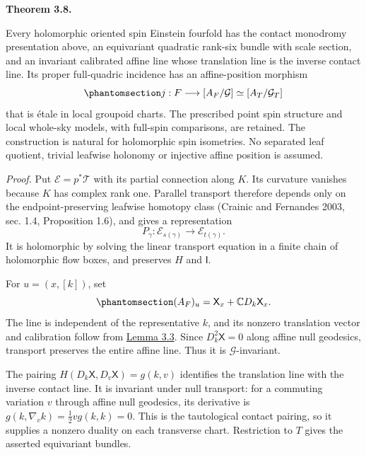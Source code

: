 \documentclass[
  english,
  11pt,
  reqno]{amsart}
\makeatletter
\newcommand{\pandocstatementheading}[1]{%
  \par\addpenalty{\@beginparpenalty}%
  \addvspace{.5\baselineskip plus .2\baselineskip minus .2\baselineskip}%
  {\normalfont\bfseries #1\par}%
  \nobreak\@afterindenttrue\@afterheading
}
\makeatother
\begin{document}
\pandocstatementheading{\protect{}\label{thm:monodromy-affine-forward-construction}Theorem 3.8.}

Every holomorphic oriented spin Einstein fourfold has the contact
monodromy presentation above, an equivariant quadratic rank-six bundle
with scale section, and an invariant calibrated affine line whose
translation line is the inverse contact line. Its proper full-quadric
incidence has an affine-position morphism
\begin{equation}\protect\phantomsection\label{eq:monodromy-affine-position-morphism}{
j:F\longrightarrow[A_F/\mathcal G]\simeq[A_T/\mathcal G_T]
}\end{equation} that is étale in local groupoid charts. The prescribed
point spin structure and local whole-sky models, with full-spin
comparisons, are retained. The construction is natural for holomorphic
spin isometries. No separated leaf quotient, trivial leafwise holonomy
or injective affine position is assumed.

\emph{Proof.} Put \(\mathcal E=p^*\mathcal T\) with its partial
connection along \(K\). Its curvature vanishes because \(K\) has complex
rank one. Parallel transport therefore depends only on the
endpoint-preserving leafwise homotopy class (Crainic and Fernandes 2003,
sec. 1.4, Proposition 1.6), and gives a representation \[
P_\gamma:\mathcal E_{s(\gamma)}\longrightarrow\mathcal E_{t(\gamma)}.
\] It is holomorphic by solving the linear transport equation in a
finite chain of holomorphic flow boxes, and preserves \(H\) and
\(\mathsf I\).

For \(u=(x,[k])\), set
\begin{equation}\protect\phantomsection\label{eq:monodromy-affine-line}{
(A_F)_u=\mathsf X_x+\mathbb C D_k\mathsf X_x.
}\end{equation} The line is independent of the representative \(k\), and
its nonzero translation vector and calibration follow from
\hyperref[lem:real-ray-affine-tractor]{Lemma 3.3}. Since
\(D_k^2\mathsf X=0\) along affine null geodesics, transport preserves
the entire affine line. Thus it is \(\mathcal G\)-invariant.

The pairing \(H(D_k\mathsf X,D_v\mathsf X)=g(k,v)\) identifies the
translation line with the inverse contact line. It is invariant under
null transport: for a commuting variation \(v\) through affine null
geodesics, its derivative is \(g(k,\nabla_vk)=\tfrac12v g(k,k)=0\). This
is the tautological contact pairing, so it supplies a nonzero duality on
each transverse chart. Restriction to \(T\) gives the asserted
equivariant bundles.
\end{document}
